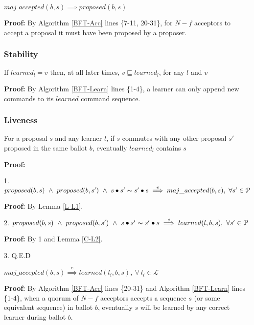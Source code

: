 \begin{lemma}
$maj\_accepted(b,s) \implies proposed(b,s)$ \label{N-L1} \par
\end{lemma}
\textbf{Proof:} By Algorithm \ref{BFT-Acc} lines \{7-11, 20-31\}, for $N-f$ acceptors to accept a proposal it must have been proposed by a proposer.

\subsubsection{Stability}
\begin{theorem}
If $learned_l = v$ then, at all later times, $v \sqsubseteq learned_l$, for any $l$ and $v$ \par \label{S-T1}
\end{theorem} 
\textbf{Proof:} By Algorithm \ref{BFT-Learn} lines \{1-4\}, a learner can only append new commands to its $learned$ command sequence.

\subsubsection{Liveness}
\begin{theorem}
For a proposal $s$ and any learner $l$, if $s$ commutes with any other proposal $s'$ proposed in the same ballot $b$, eventually $learned_l$ contains $s$ \label{L-T1} \par
\end{theorem} 
\textbf{Proof:} \par
1. $proposed(b,s)\ \land\ proposed(b,s')\ \land\ s\bullet s' \thicksim  s' \bullet s  \overset{e}{\implies} maj\_accepted(b,s),\ \forall s' \in \mathcal{P}$ \par
\indent\indent\textbf{Proof:} By Lemma \ref{L-L1}.\par
2. $proposed(b,s)\ \land\ proposed(b,s')\ \land\ s\bullet s' \thicksim s' \bullet s \overset{e}{\implies} learned(l,b,s),\ \forall s' \in \mathcal{P}$ \par
\indent\indent\textbf{Proof:} By 1 and Lemma \ref{C-L2}. \par
3. Q.E.D

\begin{lemma}
	$maj\_accepted(b,s) \overset{e}{\implies} learned(l_i,b,s),\ \forall\ l_i \in \mathcal{L}$ \label{C-L2} \par
\end{lemma}
\textbf{Proof:} By Algorithm \ref{BFT-Acc} lines \{20-31\} and Algorithm \ref{BFT-Learn} lines \{1-4\}, when a quorum of $N-f$ acceptors accepts a sequence $s$ (or some equivalent sequence) in ballot $b$, eventually $s$ will be learned by any correct learner during ballot $b$.

